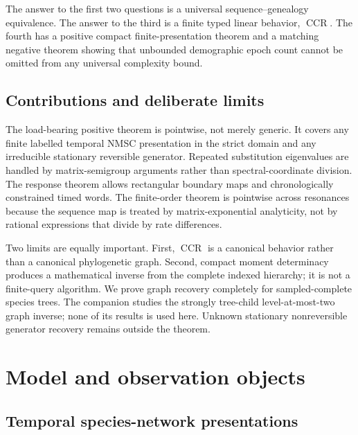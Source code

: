 \documentclass[11pt]{article}
\newcommand{\CCR}{\operatorname{CCR}}
\begin{document}
The answer to the first two questions is a universal sequence--genealogy equivalence.  The answer to the third is a finite typed linear behavior, $\CCR$.  The fourth has a positive compact finite-presentation theorem and a matching negative theorem showing that unbounded demographic epoch count cannot be omitted from any universal complexity bound.

\subsection{Contributions and deliberate limits}

The load-bearing positive theorem is pointwise, not merely generic.  It covers any finite labelled temporal NMSC presentation in the strict domain and any irreducible stationary reversible generator.  Repeated substitution eigenvalues are handled by matrix-semigroup arguments rather than spectral-coordinate division.  The response theorem allows rectangular boundary maps and chronologically constrained timed words.  The finite-order theorem is pointwise across resonances because the sequence map is treated by matrix-exponential analyticity, not by rational expressions that divide by rate differences.

Two limits are equally important.  First, $\CCR$ is a canonical behavior rather than a canonical phylogenetic graph.  Second, compact moment determinacy produces a mathematical inverse from the complete indexed hierarchy; it is not a finite-query algorithm.  We prove graph recovery completely for sampled-complete species trees.  The companion studies the strongly tree-child level-at-most-two graph inverse; none of its results is used here.  Unknown stationary nonreversible generator recovery remains outside the theorem.

\section{Model and observation objects}
\label{sec:model}

\subsection{Temporal species-network presentations}
\end{document}
